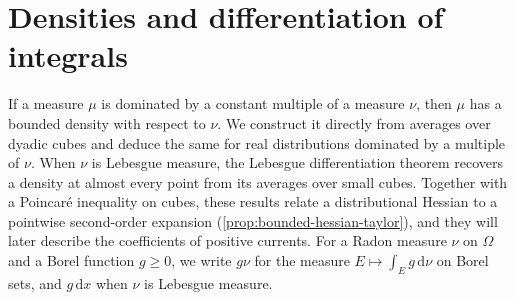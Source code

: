 \section{Densities and differentiation of integrals}
\label{sec:densities-differentiation}

If a measure $\mu$ is dominated by a constant multiple of a measure $\nu$, then $\mu$ has a bounded density with respect to $\nu$. We construct it directly from averages over dyadic cubes and deduce the same for real distributions dominated by a multiple of $\nu$. When $\nu$ is Lebesgue measure, the Lebesgue differentiation theorem recovers a density at almost every point from its averages over small cubes. Together with a Poincar\'e inequality on cubes, these results relate a distributional Hessian to a pointwise second-order expansion (\cref{prop:bounded-hessian-taylor}), and they will later describe the coefficients of positive currents. For a Radon measure $\nu$ on $\Omega$ and a Borel function $g\geq0$, we write $g\nu$ for the measure $E\mapsto\int_Eg\,\mathrm d\nu$ on Borel sets, and $g\,\mathrm dx$ when $\nu$ is Lebesgue measure.

